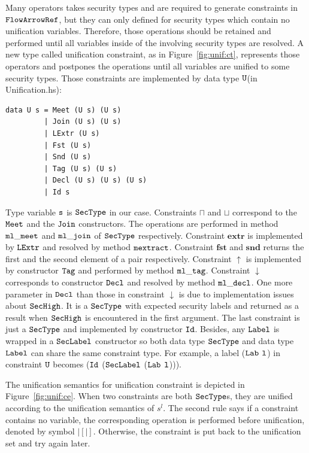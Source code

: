\documentclass{report}
\newcommand{\co}[1]{$\cod{#1}$}
\newcommand{\st}{s^l}
\newcommand{\tagup}{\uparrow}
\newcommand{\decl}{\downarrow}
\begin{document}
Many operators takes security types and are required to generate constraints in \co{FlowArrowRef}, but
they can only defined for security types which contain no unification variables. 
Therefore, those operations should be retained and performed until all variables inside of the involving
security types are resolved. A new type called unification constraint, as in Figure~\ref{fig:unif:ct}, 
represents those operators and postpones the operations until all variables are unified to some
security types.
Those constraints are implemented by data type \co{U}(in Unification.hs):
\begin{Verbatim}[fontsize=\small]
data U s = Meet (U s) (U s)
         | Join (U s) (U s)
         | LExtr (U s)
         | Fst (U s)
         | Snd (U s)
         | Tag (U s) (U s)
         | Decl (U s) (U s) (U s)
         | Id s
\end{Verbatim}
Type variable \co{s} is \co{SecType} in our case. 
Constraints $\sqcap$ and $\sqcup$ correspond to the \co{Meet} and the \co{Join} constructors. 
The operations are performed in method \co{ml\_meet} and \co{ml\_join} of \co{SecType} respectively. 
Constraint $\mathbf{extr}$ is implemented by \co{LExtr} and resolved by method \co{mextract}.
Constraint $\mathbf{fst}$ and $\mathbf{snd}$ returns the first and the second element of a pair respectively.
Constraint $\tagup$ is implemented by constructor \co{Tag} and performed by method \co{ml\_tag}.
Constraint $\decl$ corresponds to constructor \co{Decl} and resolved by method \co{ml\_decl}. One more
parameter in \co{Decl} than those in constraint $\decl$ is due to implementation issues about \co{SecHigh}. 
It is a \co{SecType} with expected security labels and returned as a result when \co{SecHigh} is encountered
in the first argument.
The last constraint is just a \co{SecType} and implemented by constructor \co{Id}.
Besides, any \co{Label} is wrapped in a \co{SecLabel} constructor so both data type \co{SecType} and data type 
\co{Label} can share the same constraint type. For example, a label (\co{Lab} \co{l}) in constraint \co{U} 
becomes  (\co{Id} (\co{SecLabel} (\co{Lab} \co{l}))).

The unification semantics for unification constraint is depicted in Figure~\ref{fig:unif:ce}. When two constraints
are both \co{SecType}s, they are unified according to the unification semantics of $\st$. The second rule says
if a constraint contains no variable, the corresponding operation is performed before unification, 
denoted by symbol $|[|]$. Otherwise, the constraint is put back to the unification set and try again later.
\end{document}
